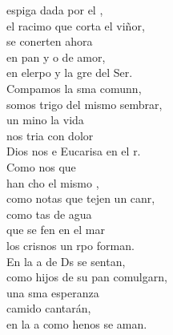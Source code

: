\documentclass[12pt]{article}
\begin{document}
\begin{multicols*}{2}
\begin{cancion}%
	 espiga dada por el ,\\
	el racimo que corta el viñor,\\
	se conerten ahora\\
	en pan y o de amor,\\
	en elerpo y la gre del Ser.\\
\jump
	Compamos la sma comunn,\\
	somos trigo del mismo sembrar,\\
	un mino la vida \\
	nos tria con dolor\\
	Dios nos e Eucarisa en el r.\\
\jump
	Como nos que \\
	han cho el mismo ,\\
	como notas que tejen un canr,\\
	como tas de agua \\
	que se fen en el mar\\
	los crisnos un rpo forman.\\
\jump
	En la a de Ds se sentan,\\
	como hijos de su pan comulgarn,\\
	una sma esperanza \\
	camido cantarán,\\
	en la a como henos se aman.\\
\end{cancion}%


\end{multicols*}
\end{document}
